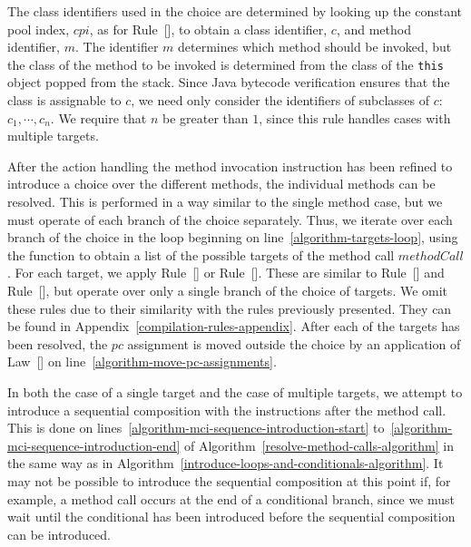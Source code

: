 The class identifiers used in the choice are determined by looking up
the constant pool index, $cpi$, as for
Rule~[], to obtain a class
identifier, $c$, and method identifier, $m$.
The identifier $m$ determines which method should be invoked, but the
class of the method to be invoked is determined from the class of the
\texttt{this} object popped from the stack.
Since Java bytecode verification ensures that the class is assignable
to $c$, we need only consider the identifiers of subclasses of
$c$:~$c_1, \cdots , c_n$.
We require that $n$ be greater than $1$, since this rule handles cases
with multiple targets.

After the action handling the method invocation instruction has been
refined to introduce a choice over the different methods, the
individual methods can be resolved.
This is performed in a way similar to the single method case, but we
must operate of each branch of the choice separately.
Thus, we iterate over each branch of the choice in the loop beginning
on line~\ref{algorithm-targets-loop}, using the function
 to obtain a list of the possible targets
of the method call $methodCall$.
For each target, we apply
Rule~[] or
Rule~[].
These are similar to Rule~[] and
Rule~[], but operate over only a
single branch of the choice of targets.
We omit these rules due to their similarity with the rules previously
presented.
They can be found in Appendix~\ref{compilation-rules-appendix}.
After each of the targets has been resolved, the $pc$ assignment is
moved outside the choice by an application of
Law~[] on
line~\ref{algorithm-move-pc-assignments}.

In both the case of a single target and the case of multiple targets,
we attempt to introduce a sequential composition with the instructions
after the method call.
This is done on lines~\ref{algorithm-mci-sequence-introduction-start}
to~\ref{algorithm-mci-sequence-introduction-end} of
Algorithm~\ref{resolve-method-calls-algorithm} in the same way as in
Algorithm~\ref{introduce-loops-and-conditionals-algorithm}.
It may not be possible to introduce the sequential composition at this
point if, for example, a method call occurs at the end of a
conditional branch, since we must wait until the conditional has been
introduced before the sequential composition can be introduced.


